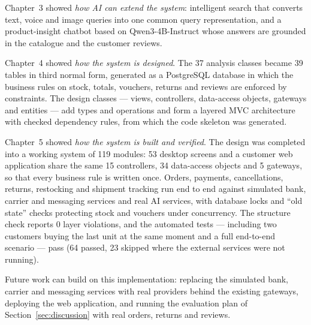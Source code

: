 \documentclass[11pt,a4paper,oneside]{extreport}
\begin{document}
Chapter~3 showed \emph{how AI can extend the system}: intelligent search that converts text, voice and image queries into one common query representation, and a product-insight chatbot based on Qwen3-4B-Instruct whose answers are grounded in the catalogue and the customer reviews.

Chapter~4 showed \emph{how the system is designed}. The 37 analysis classes became 39 tables in third normal form, generated as a PostgreSQL database in which the business rules on stock, totals, vouchers, returns and reviews are enforced by constraints. The design classes --- views, controllers, data-access objects, gateways and entities --- add types and operations and form a layered MVC architecture with checked dependency rules, from which the code skeleton was generated.

Chapter~5 showed \emph{how the system is built and verified}. The design was completed into a working system of 119 modules: 53 desktop screens and a customer web application share the same 15 controllers, 34 data-access objects and 5 gateways, so that every business rule is written once. Orders, payments, cancellations, returns, restocking and shipment tracking run end to end against simulated bank, carrier and messaging services and real AI services, with database locks and ``old state'' checks protecting stock and vouchers under concurrency. The structure check reports 0 layer violations, and the automated tests --- including two customers buying the last unit at the same moment and a full end-to-end scenario --- pass (64 passed, 23 skipped where the external services were not running).

Future work can build on this implementation: replacing the simulated bank, carrier and messaging services with real providers behind the existing gateways, deploying the web application, and running the evaluation plan of Section~\ref{sec:discussion} with real orders, returns and reviews.
\end{document}
